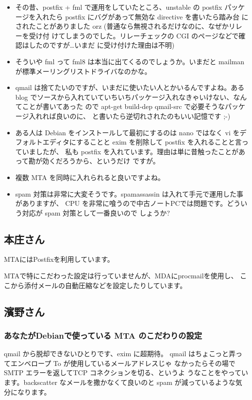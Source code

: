 \documentclass[mingoth,a4paper]{jsarticle}
\begin{document}
\begin{itemize}
\item その昔、postfix + fml で運用をしていたところ、unstable の postfix 
パッケージを入れたら postfix にバグがあって無効な directive を書いたら踏み台
にされたことがありました orz (普通なら無視されるだけなのに、なぜかリレーを受け付
けてしまうのでした。リレーチェックの CGI のページなどで確認はしたのですが…いまだ
に受け付けた理由は不明)

\item そういや fml って fml8 は本当に出てくるのでしょうか。いまだと mailman 
が標準メーリングリストドライバなのかな。

\item qmail は捨てたいのですが、いまだに使いたい人とかいるんですよね。ある blog 
でソースから入れていていちいちパッケージ入れなきゃいけない、なんてことが書いてあった
ので apt-get build-dep qmail-src で必要そうなパッケージ入れれば良いのに、
と書いたら逆切れされたのもいい記憶です ;-)

\item ある人は Debian をインストールして最初にするのは nano ではなく vi 
をデフォルトエディタにすることと exim を削除して postfix を入れることと言っていましたが、
私も postfix を入れています。理由は単に昔触ったことがあって勘が効くだろうから、というだけ
ですが。

\item 複数 MTA を同時に入れられると良いですよね。

\item spam 対策は非常に大変そうです。spamassassin は入れて手元で運用した事がありますが、
CPU を非常に喰うので中古ノートPCでは問題です。どういう対応が spam 対策として一番良いので
しょうか?
\end{itemize}

\subsection{本庄さん}
MTAにはPostfixを利用しています。

MTAで特にこだわった設定は行っていませんが、MDAにprocmailを使用し、
ここから添付メールの自動圧縮などを設定したりしています。

\subsection{濱野さん}
\subsubsection{あなたがDebianで使っている MTA のこだわりの設定}
qmail から脱却できないひとりです、exim に超期待。
qmail はちょこっと弄ってエンベロープ To が使用しているメールアドレスじゃ
なかったらその場で SMTP エラーを返してTCP コネクションを切る、というよ
うなことをやっています。backscatter なメールを撒かなくて良いのと spam
が減っているような気分になります。
\end{document}
